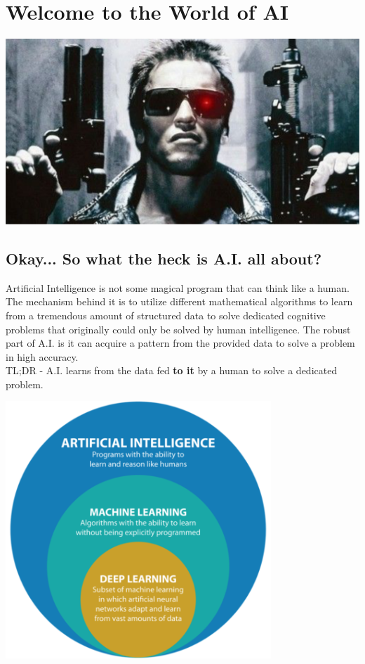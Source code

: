 \documentclass{42-en}
\begin{document}
\chapter{Welcome to the World of AI}

\centerline{\includegraphics[width=150mm]{images/ahnold.png}}

\section*{Okay... So what the heck is A.I. all about?}

Artificial Intelligence is not some magical program that can think like a human. The mechanism behind it is to utilize different mathematical algorithms to learn from a tremendous amount of structured data to solve dedicated cognitive problems that originally could only be solved by human intelligence. The robust part of A.I. is it can acquire a pattern from the provided data to solve a problem in high accuracy.\\
  
TL;DR - A.I. learns from the data fed \textbf{to it} by a human to solve a dedicated problem.\\

\centerline{\includegraphics[width=100mm]{images/learning_diag.png}}
\end{document}
